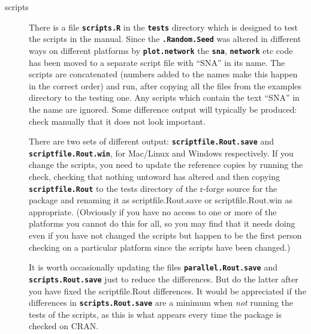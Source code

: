 \documentclass[12pt, a4paper]{article}
\renewcommand{\=}{\,=\,}
\newcommand{\+}{\,+\,}
\newcommand{\sfn}[1]{\textbf{\texttt{#1}}}
\begin{document}
\begin{description}
\item[scripts] There is a file \sfn{scripts.R} in the \sfn{tests} directory
  which is designed to test the scripts in the manual. Since the
 \sfn{.Random.Seed} was altered in different ways on different platforms by
  \sfn{plot.network} the \sfn{sna}, \sfn{network} etc code has been moved to a
  separate script file with ``SNA'' in its name.  The
  scripts are concatenated (numbers added to the names make this happen in
  the correct order) and run, after copying all the files from the examples
  directory to the testing one. Any scripts which contain the text ``SNA'' in the
  name are ignored. Some difference output will typically be produced: check
  manually that it does not look important.

  There are two sets of different output: \sfn{scriptfile.Rout.save} and
  \sfn{scriptfile.Rout.win}, for Mac/Linux and Windows respectively. If you
  change the scripts, you need to update the reference copies by running the
  check, checking that nothing untoward has altered and then copying
  \sfn{scriptfile.Rout} to the tests directory of the r-forge source for the
  package and renaming it as scriptfile.Rout.save or scriptfile.Rout.win as
  appropriate. (Obviously if you have no access to one or more of the platforms
  you cannot do this for all, so you may find that it needs doing even if you
  have not changed the scripts but happen to be the first person checking on a
  particular platform since the scripts have been changed.)

  It is worth occasionally updating the files \sfn{parallel.Rout.save} and
  \sfn{scripts.Rout.save} just to reduce the differences. But do the latter
  after you have fixed the scriptfile.Rout differences. It would be appreciated
  if the differences in \sfn{scripts.Rout.save} are a minimum when \emph{not}
  running the tests of the scripts, as this is what appears every time the
  package is checked on CRAN.


\end{description}
\end{document}
